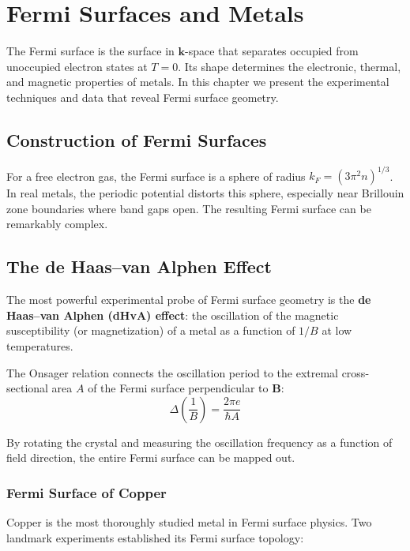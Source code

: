 \chapter{Fermi Surfaces and Metals}

The Fermi surface is the surface in $\mathbf{k}$-space that separates occupied from unoccupied electron states at $T = 0$. Its shape determines the electronic, thermal, and magnetic properties of metals. In this chapter we present the experimental techniques and data that reveal Fermi surface geometry.

\section{Construction of Fermi Surfaces}

For a free electron gas, the Fermi surface is a sphere of radius $k_F = (3\pi^2 n)^{1/3}$. In real metals, the periodic potential distorts this sphere, especially near Brillouin zone boundaries where band gaps open. The resulting Fermi surface can be remarkably complex.

\section{The de Haas--van Alphen Effect}

The most powerful experimental probe of Fermi surface geometry is the \textbf{de Haas--van Alphen (dHvA) effect}: the oscillation of the magnetic susceptibility (or magnetization) of a metal as a function of $1/B$ at low temperatures.

The Onsager relation connects the oscillation period to the extremal cross-sectional area $A$ of the Fermi surface perpendicular to $\mathbf{B}$:
\begin{equation}
  \Delta\left(\frac{1}{B}\right) = \frac{2\pi e}{\hbar A}
\end{equation}

By rotating the crystal and measuring the oscillation frequency as a function of field direction, the entire Fermi surface can be mapped out.

\subsection{Fermi Surface of Copper}

Copper is the most thoroughly studied metal in Fermi surface physics. Two landmark experiments established its Fermi surface topology:


